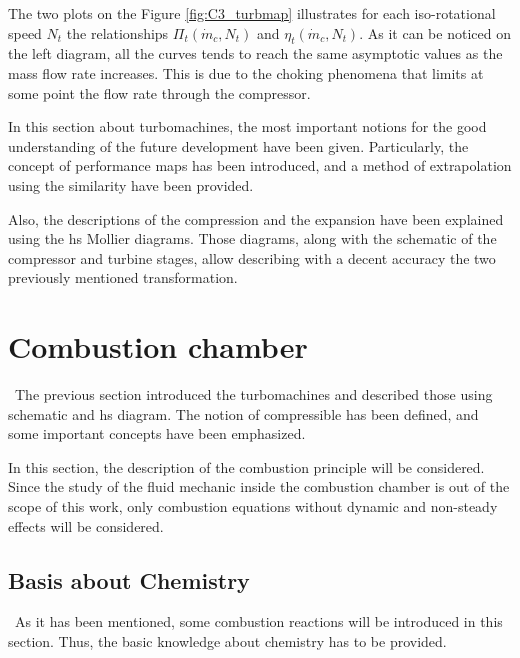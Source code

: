 The two plots on the Figure \ref{fig:C3_turbmap} illustrates for each iso-rotational speed \(N_t\) the relationships \(\Pi_t(\dot{m}_c,N_t)\) and \(\eta_t(\dot{m}_c,N_t)\). As it can be noticed on the left diagram, all the curves tends to reach the same asymptotic values as the mass flow rate increases. This is due to the choking phenomena that limits at some point the flow rate through the compressor.

In this section about turbomachines, the most important notions for the good understanding of the future development have been given. Particularly, the concept of performance maps has been introduced, and a method of extrapolation using the similarity have been provided.

Also, the descriptions of the compression and the expansion have been explained using the hs Mollier diagrams. Those diagrams, along with the schematic of the compressor and turbine stages, allow describing with a decent accuracy the two previously mentioned transformation.
\newpage
\section{Combustion chamber}
\quad\ The previous section introduced the turbomachines and described those using schematic and hs diagram. The notion of compressible has been defined, and some important concepts have been emphasized.

In this section, the description of the combustion principle will be considered. Since the study of the fluid mechanic inside the combustion chamber is out of the scope of this work, only combustion equations without dynamic and non-steady effects will be considered.

\subsection{Basis about Chemistry}
\quad\ As it has been mentioned, some combustion reactions will be introduced in this section. Thus, the basic knowledge about chemistry has to be provided.

